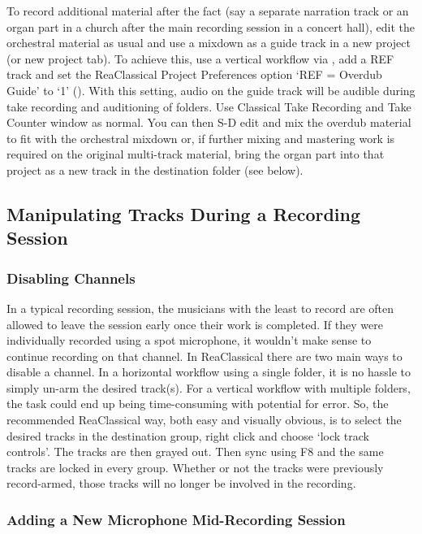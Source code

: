 \documentclass[10pt,american]{article}
\begin{document}
To record additional material after the fact (say a separate narration track or
an organ part in a church after the main recording session in a concert hall),
edit the orchestral material as usual and use a mixdown as a guide track in a
new project (or new project tab). To achieve this, use a vertical workflow via
, add a REF track  and set the ReaClassical Project Preferences
option `REF = Overdub Guide' to `1' (). With this setting, audio on the
guide track will be audible during take recording and auditioning of folders.
Use Classical Take Recording  and Take Counter window
\keys{\ctrl+\enter} as normal. You can then S-D edit and mix the overdub
material to fit with the orchestral mixdown or, if further mixing and mastering
work is required on the original multi-track material, bring the organ part into
that project as a new track in the destination folder  (see
below).

\subsection{Manipulating Tracks During a Recording Session}

\subsubsection{Disabling Channels}

In a typical recording session, the musicians with the least to record are often
allowed to leave the session early once their work is completed. If they were
individually recorded using a spot microphone, it wouldn't make sense to
continue recording on that channel. In ReaClassical there are two main ways to
disable a channel. In a horizontal workflow using a single folder, it is no
hassle to simply un-arm the desired track(s). For a vertical workflow with
multiple folders, the task could end up being time-consuming with potential for
error. So, the recommended ReaClassical way, both easy and visually obvious, is
to select the desired tracks in the destination group, right click and choose
`lock track controls'. The tracks are then grayed out. Then sync using F8 and
the same tracks are locked in every group. Whether or not the tracks were
previously record-armed, those tracks will no longer be involved in the
recording.

\subsubsection{Adding a New Microphone Mid-Recording Session}
\end{document}
